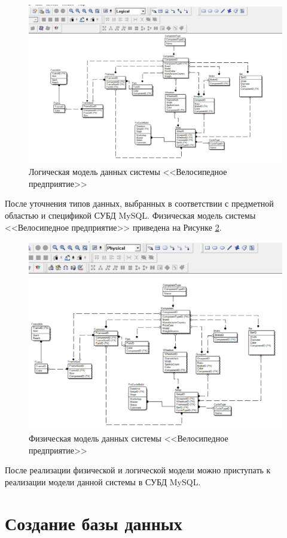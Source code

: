 \documentclass[a4paper,14pt]{extarticle}
\begin{document}
\begin{figure}[h!]
	\centering
	\includegraphics[width=0.8\linewidth]{images/2-cycle-logical}
	\caption{Логическая модель данных системы <<Велосипедное предприятие>>}
	\label{fig:2-cycle-logical}
\end{figure}

После уточнения типов данных, выбранных в соответствии с предметной областью и спецификой СУБД MySQL.
Физическая модель системы <<Велосипедное предприятие>> приведена на Рисунке \ref{fig:2-cycle-phisical}.

\begin{figure}[h!]
	\centering
	\includegraphics[width=0.8\linewidth]{images/2-cycle-phisical}
	\caption{Физическая модель данных системы <<Велосипедное предприятие>>}
	\label{fig:2-cycle-phisical}
\end{figure}

После реализации физической и логической модели можно приступать к реализации модели данной системы в СУБД MySQL.
\hfill
\newpage
\section{Создание базы данных}
\end{document}

